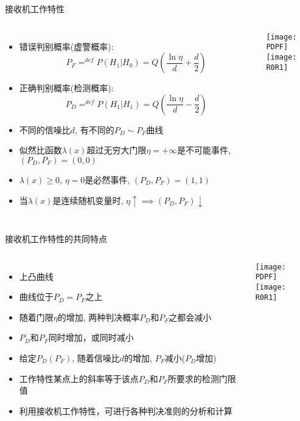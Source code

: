 \begin{frame}[shrink]{接收机工作特性}
\begin{columns}[T]
	\begin{itemize}
		\small
		\item 错误判别概率(虚警概率):
		\[P_F\mathop{=}^{def}P(H_1|H_0)=Q\left(\frac{\ln\eta}{d}+\frac{d}{2}\right)\]
		\item 正确判别概率(检测概率):
		\[P_D\mathop{=}^{def}P(H_1|H_1)=Q\left(\frac{\ln\eta}{d}-\frac{d}{2}\right)\]
		\item 不同的信噪比$d$, 有不同的$P_D\sim P_F$曲线
		\item 似然比函数$\lambda(x)$超过无穷大门限$\eta=+\infty$是不可能事件, $(P_D,P_F)=(0,0)$
		\item $\lambda(x)\ge 0$, $\eta=0$是必然事件, $(P_D,P_F)=(1,1)$
		\item 当$\lambda(x)$是连续随机变量时, $\eta\uparrow\implies (P_D,P_F)\downarrow$
	\end{itemize}
	\texttt{[image: PDPF]}\\
	\texttt{[image: R0R1]}
\end{columns}
\end{frame}

\begin{frame}[shrink]{接收机工作特性的共同特点}
\begin{columns}[T]
	\begin{itemize}
		\small
		\item 上凸曲线
		\item 曲线位于$P_D=P_F$之上
		\item 随着门限$\eta$的增加, 两种判决概率$P_D$和$P_F$之都会减小
		\item $P_D$和$P_F$同时增加，或同时减小
		\item 给定$P_D(P_F)$, 随着信噪比$d$的增加, $P_F$减小($P_D$增加)
		\item 工作特性某点上的斜率等于该点$P_D$和$P_F$所要求的检测门限值
		\item 利用接收机工作特性，可进行各种判决准则的分析和计算
	\end{itemize}
	\texttt{[image: PDPF]}\\
	\texttt{[image: R0R1]}
\end{columns}
\end{frame}

